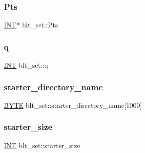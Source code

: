 \mbox{\label{classblt__set_ae18de524470a21ae475d1e5716a36ef8}} 
\subsubsection{\texorpdfstring{Pts}{Pts}}
{\footnotesize\ttfamily \mbox{\hyperlink{galois_8h_a09fddde158a3a20bd2dcadb609de11dc}{I\+NT}}$\ast$ blt\+\_\+set\+::\+Pts}

\mbox{\label{classblt__set_a3f3d287695ca239c93035cee047e9be6}} 
\subsubsection{\texorpdfstring{q}{q}}
{\footnotesize\ttfamily \mbox{\hyperlink{galois_8h_a09fddde158a3a20bd2dcadb609de11dc}{I\+NT}} blt\+\_\+set\+::q}

\mbox{\label{classblt__set_ae25dafff91276e73cfc8c84da2e3aa0b}} 
\subsubsection{\texorpdfstring{starter\+\_\+directory\+\_\+name}{starter\_directory\_name}}
{\footnotesize\ttfamily \mbox{\hyperlink{galois_8h_ab6cc7b4aeb6ea31aba2b3fbfc83ff5e6}{B\+Y\+TE}} blt\+\_\+set\+::starter\+\_\+directory\+\_\+name\mbox{[}1000\mbox{]}}

\mbox{\label{classblt__set_a5227d5487da07366a96c3a1c4eba1814}} 
\subsubsection{\texorpdfstring{starter\+\_\+size}{starter\_size}}
{\footnotesize\ttfamily \mbox{\hyperlink{galois_8h_a09fddde158a3a20bd2dcadb609de11dc}{I\+NT}} blt\+\_\+set\+::starter\+\_\+size}

